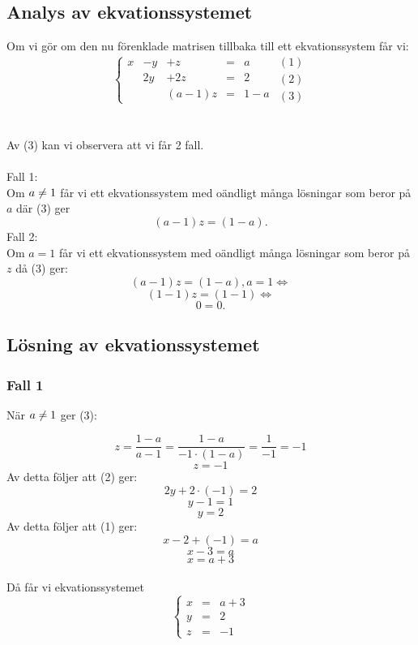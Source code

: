 \documentclass[11pt]{article}
\begin{document}
\subsection{Analys av ekvationssystemet}
Om vi gör om den nu förenklade matrisen tillbaka till ett ekvationssystem får vi:
$$
\left\{\begin{array}{ccccc}
 x & -y & +z & = & a \\
  & 2y & +2z & = & 2\\
  &  & (a-1)z & = & 1-a
\end{array}\right.
\begin{array}{c}
(1)\\ (2) \\ (3)
\end{array}
$$\\\\
Av (3) kan vi observera att vi får 2 fall.\\\\
Fall 1: \\
	Om $a \centernot = 1$ får vi ett ekvationssystem med oändligt många lösningar som beror på $a$ där (3) ger $$(a-1)z = (1-a).$$
Fall 2:\\
Om $a = 1$ får vi ett ekvationssystem med oändligt många lösningar som beror på $z$ då (3) ger:
	$$(a-1)z = (1-a), a = 1 \Leftrightarrow $$
	$$ (1-1)z = (1-1) \Leftrightarrow $$
	$$ 0=0.$$
\subsection{Lösning av ekvationssystemet}
\subsubsection{Fall 1}
När $a \centernot = 1$ ger (3):

$$z = \frac{1-a}{a-1} = \frac{1-a}{-1 \cdot (1-a)} = \frac{1}{-1} = -1$$
$$z = -1$$
Av detta följer att (2) ger:
$$2y + 2 \cdot(-1) = 2$$
$$y-1=1$$
$$y=2$$
Av detta följer att (1) ger:
$$x -2 + (-1) = a$$
$$x-3 = a$$
$$x = a+3$$\\
Då får vi ekvationssystemet
$$
\left\{\begin{array}{ccc}
 x & = & a+3\\
 y & = & 2\\
 z & = & -1
\end{array}\right.
$$
\end{document}
